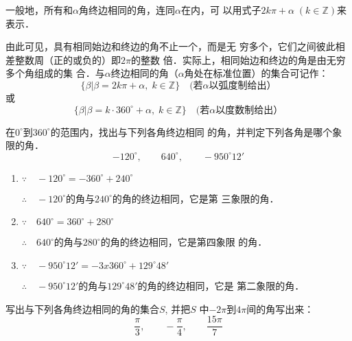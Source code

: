 一般地，所有和$\alpha$角终边相同的角，连同$\alpha$在内，可
以用式子$2k\pi+\alpha\; (k\in\mathbb{Z})$来表示．

由此可见，具有相同始边和终边的角不止一个，而是无
穷多个，它们之间彼此相差整数周（正的或负的）即$2\pi$的整数
倍．实际上，相同始边和终边的角是由无穷多个角组成的集
合．与$\alpha$终边相同的角（$\alpha$角处在标准位置）的集合可记作：
\[\{\beta|\beta=2k\pi+\alpha,\; k\in\mathbb{Z}\}\quad  \text{(若$\alpha$以弧度制给出）}\]
或
\[\{\beta|\beta=k\cdot 360^{\circ}+\alpha,\; k\in\mathbb{Z}\}\quad  \text{(若$\alpha$以度数制给出）}\]


\begin{example}
    在$0^{\circ}$到$360^{\circ}$的范围内，找出与下列各角终边相同
的角，并判定下列各角是哪个象限的角．
\[-120^{\circ},\qquad 640^{\circ},\qquad -950^{\circ}12'\]

\end{example}


\begin{solution}
\begin{enumerate}
    \item $\because\quad -120^{\circ}=-360^{\circ}+240^{\circ}$
    
$\therefore\quad -120^{\circ}$的角与$240^{\circ}$的角的终边相同，它是第
三象限的角．
\item $\because\quad 640^{\circ}=360^{\circ}+280^{\circ}$

$\therefore\quad 640^{\circ}$的角与$280^{\circ}$的角的终边相同，它是第四象限
的角．

\item $\because\quad -950^{\circ}12'=-3x360^{\circ}+129^{\circ}48'$

$\therefore\quad -950^{\circ}12'$的角与$129^{\circ}48'$的角的终边相同，它是
第二象限的角．
\end{enumerate}
\end{solution}

\begin{example}
写出与下列各角终边相同的角的集合$S$, 并把$S$
中$-2\pi$到$4\pi$间的角写出来：
\[\frac{\pi}{3},\qquad -\frac{\pi}{4},\qquad \frac{15\pi}{7}\]
\end{example}

